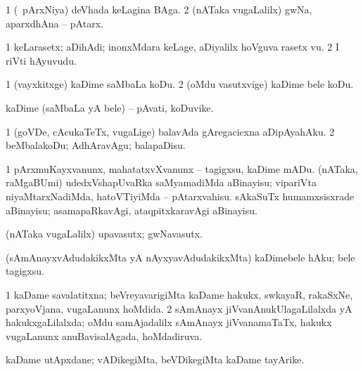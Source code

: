 \bentry
{} 
\gl{\nA}
\expl{}
\bmng
\bnum
\num{1} (\kanmu\ pArxNiya) deVhada keLagina BAga. 
\num{2} (nATaka \mo vugaLalilx) gwNa, aparxdhAna -- pAtarx. 
\enum
\emng
\eentry

\bentry
{} 
\gl{\nA}
\expl{}
\bmng
\bnum
\num{1} keLarasetx; aDihAdi; inonxMdara keLage, aDiyalilx hoVguva rasetx \mo vu. 
\num{2} I riVti hAyuvudu. 
\enum
\emng
\eentry

\bentry
{} 
\gl{\sakirx}
\bmng
\bnum
\num{1} (vayxkitxge) kaDime saMbaLa koDu. 
\num{2} (oMdu vasutxvige) kaDime bele koDu. 
\enum
\emng
\eentry

\bentry
{} 
\gl{\nA}
\expl{}
\bmng
kaDime (saMbaLa yA bele) -- pAvati, koDuvike. 
\emng
\eentry

\bentry
{} 
\gl{\sakirx}
\bmng
\bnum
\num{1} (goVDe, cAcukaTeTx, \mo vugaLige) balavAda gAregacicxna aDipAyahAku. 
\num{2} beMbalakoDu; AdhAravAgu; balapaDisu. 
\enum
\emng
\eentry

\bentry
{} 
\gl{\sakirx}
\expl{}
\bmng
\bnum
\num{1} pArxmuKayxvanunx, mahatatxvXvanunx -- tagigxsu, kaDime mADu. 
 (nATaka, raMgaBUmi) 
\banum
{} udedxVshapUvaRka saMyamadiMda aBinayisu; vipariVta niyaMtarxNadiMda, hatoVTiyiMda -- pAtarxvahisu. 
 sAkaSuTx humamxsisxrade aBinayisu; asamapaRkavAgi, ataqpitxkaravAgi aBinayisu. 
\eanum
\numie
\enum
\emng
\eentry

\bentry
{} 
\gl{\nA}
\expl{}
\bmng
 (nATaka \mo vugaLalilx) upavasutx; gwNavasutx. 
\emng
\eentry

\bentry
{} 
\gl{\sakirx}
\expl{}
\bmng
 (sAmAnayxvAdudakikxMta yA nAyxyavAdudakikxMta) kaDimebele hAku; bele tagigxsu. 
\emng
\eentry

\bentry
{} 
\gl{\gu}
\expl{}
\bmng
\bnum
\num{1} kaDame savalatitxna; beVreyavarigiMta kaDame hakukx, swkayaR, rakaSxNe, parxyoVjana, \mo vugaLanunx hoMdida. 
\num{2} sAmAnayx jiVvanAnukUlagaLilalxda yA hakukxgaLilalxda; oMdu samAjadalilx sAmAnayx jiVvanamaTaTx, hakukx \mo vugaLanunx anuBavisalAgada, hoMdadiruva. 
\enum
\emng
\eentry

\bentry
{} 
\gl{\nA}
\expl{}
\bmng
 kaDame utApxdane; vADikegiMta, beVDikegiMta kaDame tayArike. 
\emng
\eentry

